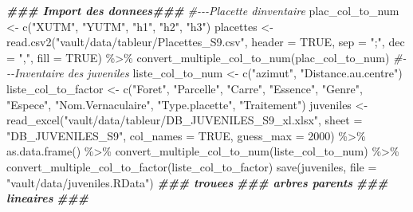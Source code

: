 \documentclass[
  12pt,
  american,
  a4paper,
  extrafontsizes,onecolumn,openright
  ]{memoir}
\newenvironment{Shaded}{\begin{snugshade}}{\end{snugshade}}
\newcommand{\AttributeTok}[1]{\textcolor[rgb]{0.77,0.63,0.00}{#1}}
\newcommand{\CommentTok}[1]{\textcolor[rgb]{0.56,0.35,0.01}{\textit{#1}}}
\newcommand{\ConstantTok}[1]{\textcolor[rgb]{0.00,0.00,0.00}{#1}}
\newcommand{\DecValTok}[1]{\textcolor[rgb]{0.00,0.00,0.81}{#1}}
\newcommand{\DocumentationTok}[1]{\textcolor[rgb]{0.56,0.35,0.01}{\textbf{\textit{#1}}}}
\newcommand{\FunctionTok}[1]{\textcolor[rgb]{0.00,0.00,0.00}{#1}}
\newcommand{\NormalTok}[1]{#1}
\newcommand{\OtherTok}[1]{\textcolor[rgb]{0.56,0.35,0.01}{#1}}
\newcommand{\SpecialCharTok}[1]{\textcolor[rgb]{0.00,0.00,0.00}{#1}}
\newcommand{\StringTok}[1]{\textcolor[rgb]{0.31,0.60,0.02}{#1}}
\begin{document}
\begin{Shaded}
\begin{Highlighting}[]
\DocumentationTok{\#\#\# Import des donnees\#\#\#}
\CommentTok{\#{-}{-}{-}Placette d\textquotesingle{}inventaire}
\NormalTok{plac\_col\_to\_num }\OtherTok{\textless{}{-}} \FunctionTok{c}\NormalTok{(}\StringTok{"XUTM"}\NormalTok{, }\StringTok{"YUTM"}\NormalTok{, }\StringTok{"h1"}\NormalTok{, }\StringTok{"h2"}\NormalTok{, }\StringTok{"h3"}\NormalTok{)}
\NormalTok{placettes }\OtherTok{\textless{}{-}} \FunctionTok{read.csv2}\NormalTok{(}\StringTok{"vault/data/tableur/Placettes\_S9.csv"}\NormalTok{,}
    \AttributeTok{header =} \ConstantTok{TRUE}\NormalTok{, }\AttributeTok{sep =} \StringTok{";"}\NormalTok{, }\AttributeTok{dec =} \StringTok{","}\NormalTok{, }\AttributeTok{fill =} \ConstantTok{TRUE}\NormalTok{) }\SpecialCharTok{\%\textgreater{}\%}
    \FunctionTok{convert\_multiple\_col\_to\_num}\NormalTok{(plac\_col\_to\_num)}
\CommentTok{\#{-}{-}{-}Inventaire des juveniles}
\NormalTok{liste\_col\_to\_num }\OtherTok{\textless{}{-}} \FunctionTok{c}\NormalTok{(}\StringTok{"azimut"}\NormalTok{, }\StringTok{"Distance.au.centre"}\NormalTok{)}
\NormalTok{liste\_col\_to\_factor }\OtherTok{\textless{}{-}} \FunctionTok{c}\NormalTok{(}\StringTok{"Foret"}\NormalTok{, }\StringTok{"Parcelle"}\NormalTok{, }\StringTok{"Carre"}\NormalTok{, }\StringTok{"Essence"}\NormalTok{,}
    \StringTok{"Genre"}\NormalTok{, }\StringTok{"Espece"}\NormalTok{, }\StringTok{"Nom.Vernaculaire"}\NormalTok{, }\StringTok{"Type.placette"}\NormalTok{, }\StringTok{"Traitement"}\NormalTok{)}
\NormalTok{juveniles }\OtherTok{\textless{}{-}} \FunctionTok{read\_excel}\NormalTok{(}\StringTok{"vault/data/tableur/DB\_JUVENILES\_S9\_xl.xlsx"}\NormalTok{,}
    \AttributeTok{sheet =} \StringTok{"DB\_JUVENILES\_S9"}\NormalTok{, }\AttributeTok{col\_names =} \ConstantTok{TRUE}\NormalTok{, }\AttributeTok{guess\_max =} \DecValTok{2000}\NormalTok{) }\SpecialCharTok{\%\textgreater{}\%}
    \FunctionTok{as.data.frame}\NormalTok{() }\SpecialCharTok{\%\textgreater{}\%}
    \FunctionTok{convert\_multiple\_col\_to\_num}\NormalTok{(liste\_col\_to\_num) }\SpecialCharTok{\%\textgreater{}\%}
    \FunctionTok{convert\_multiple\_col\_to\_factor}\NormalTok{(liste\_col\_to\_factor)}
\FunctionTok{save}\NormalTok{(juveniles, }\AttributeTok{file =} \StringTok{"vault/data/juveniles.RData"}\NormalTok{)}
\DocumentationTok{\#\#\# trouees}
\DocumentationTok{\#\#\# arbres parents}
\DocumentationTok{\#\#\# lineaires}
\DocumentationTok{\#\#\#}
\end{Highlighting}
\end{Shaded}
\end{document}
